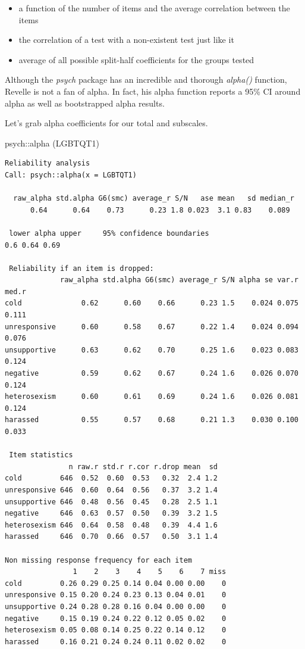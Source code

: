 \documentclass[
  english,
]{book}
\newenvironment{Shaded}{\begin{snugshade}}{\end{snugshade}}
\newcommand{\FunctionTok}[1]{\textcolor[rgb]{0.00,0.00,0.00}{#1}}
\newcommand{\NormalTok}[1]{#1}
\newcommand{\SpecialCharTok}[1]{\textcolor[rgb]{0.00,0.00,0.00}{#1}}
\providecommand{\tightlist}{%
  \setlength{\itemsep}{0pt}\setlength{\parskip}{0pt}}
\begin{document}
\begin{itemize}
\tightlist
\item
  a function of the number of items and the average correlation between the items
\item
  the correlation of a test with a non-existent test just like it
\item
  average of all possible split-half coefficients for the groups tested
\end{itemize}

Although the \emph{psych} package has an incredible and thorough \emph{alpha()} function, Revelle is not a fan of alpha. In fact, his alpha function reports a 95\% CI around alpha as well as bootstrapped alpha results.

Let's grab alpha coefficients for our total and subscales.

\begin{Shaded}
\begin{Highlighting}[]
\NormalTok{psych}\SpecialCharTok{::}\FunctionTok{alpha}\NormalTok{ (LGBTQT1)}
\end{Highlighting}
\end{Shaded}

\begin{verbatim}
Reliability analysis   
Call: psych::alpha(x = LGBTQT1)

  raw_alpha std.alpha G6(smc) average_r S/N   ase mean   sd median_r
      0.64      0.64    0.73      0.23 1.8 0.023  3.1 0.83    0.089

 lower alpha upper     95% confidence boundaries
0.6 0.64 0.69 

 Reliability if an item is dropped:
             raw_alpha std.alpha G6(smc) average_r S/N alpha se var.r med.r
cold              0.62      0.60    0.66      0.23 1.5    0.024 0.075 0.111
unresponsive      0.60      0.58    0.67      0.22 1.4    0.024 0.094 0.076
unsupportive      0.63      0.62    0.70      0.25 1.6    0.023 0.083 0.124
negative          0.59      0.62    0.67      0.24 1.6    0.026 0.070 0.124
heterosexism      0.60      0.61    0.69      0.24 1.6    0.026 0.081 0.124
harassed          0.55      0.57    0.68      0.21 1.3    0.030 0.100 0.033

 Item statistics 
               n raw.r std.r r.cor r.drop mean  sd
cold         646  0.52  0.60  0.53   0.32  2.4 1.2
unresponsive 646  0.60  0.64  0.56   0.37  3.2 1.4
unsupportive 646  0.48  0.56  0.45   0.28  2.5 1.1
negative     646  0.63  0.57  0.50   0.39  3.2 1.5
heterosexism 646  0.64  0.58  0.48   0.39  4.4 1.6
harassed     646  0.70  0.66  0.57   0.50  3.1 1.4

Non missing response frequency for each item
                1    2    3    4    5    6    7 miss
cold         0.26 0.29 0.25 0.14 0.04 0.00 0.00    0
unresponsive 0.15 0.20 0.24 0.23 0.13 0.04 0.01    0
unsupportive 0.24 0.28 0.28 0.16 0.04 0.00 0.00    0
negative     0.15 0.19 0.24 0.22 0.12 0.05 0.02    0
heterosexism 0.05 0.08 0.14 0.25 0.22 0.14 0.12    0
harassed     0.16 0.21 0.24 0.24 0.11 0.02 0.02    0
\end{verbatim}
\end{document}
